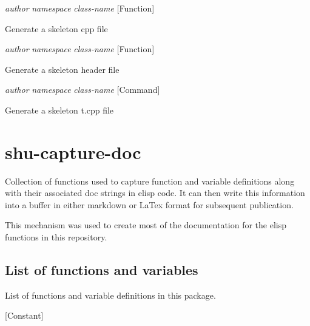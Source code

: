 \vspace{1em}
\noindent
{}
\usebox{\funcname}\emph{author} \emph{namespace} \emph{class-name}
 \hfill [Function]

\begin{doc-string}
Generate a skeleton cpp file
\end{doc-string}

\vspace{1em}
\noindent
{}
\usebox{\funcname}\emph{author} \emph{namespace} \emph{class-name}
 \hfill [Function]

\begin{doc-string}
Generate a skeleton header file
\end{doc-string}

\vspace{1em}
\noindent
{}
\usebox{\funcname}\emph{author} \emph{namespace} \emph{class-name}
 \hfill [Command]

\begin{doc-string}
Generate a skeleton t.cpp file
\end{doc-string}

\section{shu-capture-doc}


Collection of functions used to capture function and variable definitions
along with their associated doc strings in elisp code.  It can then write
this information into a buffer in either markdown or LaTex format for
subsequent publication.

This mechanism was used to create most of the documentation for the elisp
functions in this repository.


\subsection{List of functions and variables}

List of functions and variable definitions in this package.



\vspace{1em}
\noindent
{}
\usebox{\funcname}
 \hfill [Constant]

